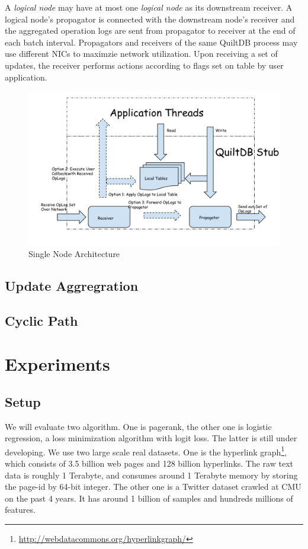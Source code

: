 \documentclass{acm_proc_article-sp}
\begin{document}
A \emph{logical node} may have at most one \emph{logical node} as its downstream
receiver. A logical node's propagator is connected with the downstream node's 
receiver and the aggregated operation logs are sent from propagator to receiver
at the end of each batch interval. Propagators and receivers of the same QuiltDB
process may use different NICs to maximzie network utilization. Upon receiving 
a set of updates, the receiver performs actions according to flags set on table
by user application.

\begin{figure}[th!]
  \centering
  \includegraphics[width=.5\textwidth]{fig/propagator-receiver.pdf}
  \caption{Single Node Architecture}
  \label{fig:prop-recv}
\end{figure}

\subsection{Update Aggregration}
\label{sec:update-aggreg}

\subsection{Cyclic Path}
\label{sec:cyclic-path}

\section{Experiments}

\subsection{Setup}

We will evaluate two algorithm. One is pagerank, the other one is logistic
regression, a loss minimization algorithm with logit loss. The latter is still
under developing. We use two large scale real datasets. One is the hyperlink
graph\footnote{\url{http://webdatacommons.org/hyperlinkgraph/}}, which consists
of 3.5 billion web pages and 128 billion hyperlinks. The raw text data is
roughly 1 Terabyte, and consumes around 1 Terabyte memory by storing the page-id
by 64-bit integer. The other one is a Twitter dataset crawled at CMU on the past
4 years. It has around 1 billion of samples and hundreds millions of
features.
\end{document}
